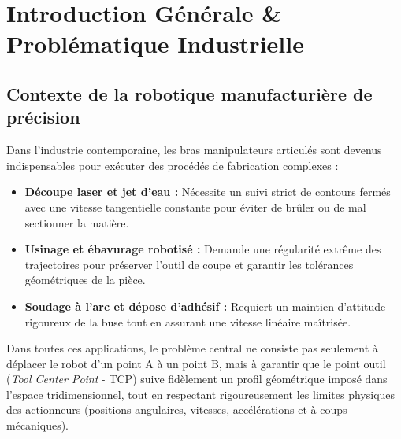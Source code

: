 \documentclass[11pt,a4paper]{report}
\begin{document}
\tableofcontents
\newpage

\chapter{Introduction Générale \& Problématique Industrielle}

\section{Contexte de la robotique manufacturière de précision}
Dans l'industrie contemporaine, les bras manipulateurs articulés sont devenus indispensables pour exécuter des procédés de fabrication complexes :
\begin{itemize}
    \item \textbf{Découpe laser et jet d'eau :} Nécessite un suivi strict de contours fermés avec une vitesse tangentielle constante pour éviter de brûler ou de mal sectionner la matière.
    \item \textbf{Usinage et ébavurage robotisé :} Demande une régularité extrême des trajectoires pour préserver l'outil de coupe et garantir les tolérances géométriques de la pièce.
    \item \textbf{Soudage à l'arc et dépose d'adhésif :} Requiert un maintien d'attitude rigoureux de la buse tout en assurant une vitesse linéaire maîtrisée.
\end{itemize}

Dans toutes ces applications, le problème central ne consiste pas seulement à déplacer le robot d'un point A à un point B, mais à garantir que le point outil (\textit{Tool Center Point} - TCP) suive fidèlement un profil géométrique imposé dans l'espace tridimensionnel, tout en respectant rigoureusement les limites physiques des actionneurs (positions angulaires, vitesses, accélérations et à-coups mécaniques).
\end{document}
